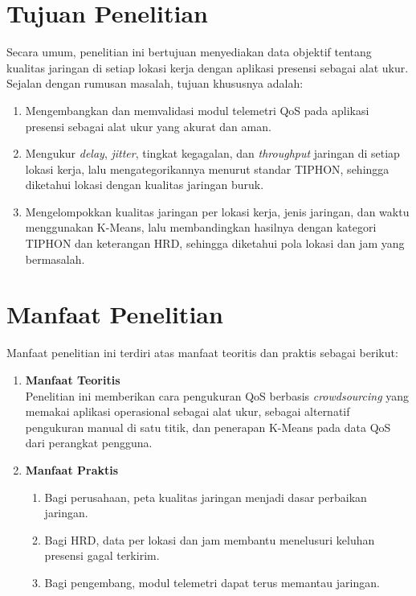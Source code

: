 \section{Tujuan Penelitian}
Secara umum, penelitian ini bertujuan menyediakan data objektif tentang kualitas jaringan di setiap lokasi kerja dengan aplikasi presensi sebagai alat ukur. Sejalan dengan rumusan masalah, tujuan khususnya adalah:
\begin{enumerate}
    \item Mengembangkan dan memvalidasi modul telemetri QoS pada aplikasi presensi sebagai alat ukur yang akurat dan aman.
    \item Mengukur \textit{delay}, \textit{jitter}, tingkat kegagalan, dan \textit{throughput} jaringan di setiap lokasi kerja, lalu mengategorikannya menurut standar TIPHON, sehingga diketahui lokasi dengan kualitas jaringan buruk.
    \item Mengelompokkan kualitas jaringan per lokasi kerja, jenis jaringan, dan waktu menggunakan K-Means, lalu membandingkan hasilnya dengan kategori TIPHON dan keterangan HRD, sehingga diketahui pola lokasi dan jam yang bermasalah.
\end{enumerate}

\section{Manfaat Penelitian}
Manfaat penelitian ini terdiri atas manfaat teoritis dan praktis sebagai berikut:
\begin{enumerate}
    \item \textbf{Manfaat Teoritis}\\
    Penelitian ini memberikan cara pengukuran QoS berbasis \textit{crowdsourcing} yang memakai aplikasi operasional sebagai alat ukur, sebagai alternatif pengukuran manual di satu titik, dan penerapan K-Means pada data QoS dari perangkat pengguna.
    \item \textbf{Manfaat Praktis}
    \begin{enumerate}[label=\alph*.]
        \item Bagi perusahaan, peta kualitas jaringan menjadi dasar perbaikan jaringan.
        \item Bagi HRD, data per lokasi dan jam membantu menelusuri keluhan presensi gagal terkirim.
        \item Bagi pengembang, modul telemetri dapat terus memantau jaringan.
    \end{enumerate}
\end{enumerate}
